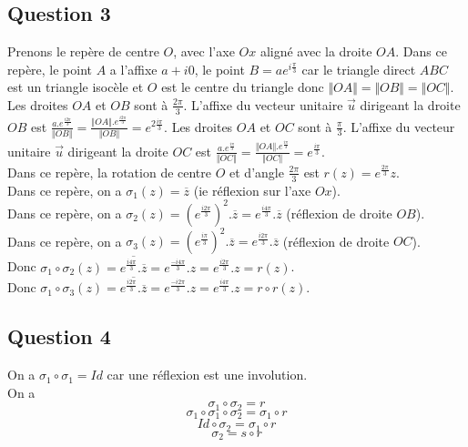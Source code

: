 \documentclass[]{book}
\theoremstyle{definition}
\begin{document}
\subsection*{Question 3}
Prenons le rep\`ere de centre $O$, avec l'axe $Ox$ align\'e avec la droite $OA$. Dans ce rep\`ere, le point $A$ a l'affixe $a+i0$, le point $B = ae^{i\frac{\pi}{3}}$ car le triangle direct $ABC$ est un triangle isoc\`ele et $O$ est le centre du triangle donc $\Vert OA \Vert = \Vert OB \Vert = \Vert OC \Vert$. Les droites $OA$ et $OB$ sont \`a $\frac{2\pi}{3}$. L'affixe du vecteur unitaire $\overrightarrow{u}$ dirigeant la droite $OB$ est $\frac{a.e^{\frac{i2\pi}{3}}}{\Vert OB \Vert} = \frac{\Vert OA \Vert.e^{\frac{i2\pi}{3}}}{\Vert OB \Vert} = e^{2\frac{i\pi}{3}}$. Les droites $OA$ et $OC$ sont \`a $\frac{\pi}{3}$. L'affixe du vecteur unitaire $\overrightarrow{u}$ dirigeant la droite $OC$ est $\frac{a.e^{\frac{i\pi}{3}}}{\Vert OC \Vert} = \frac{\Vert OA \Vert.e^{\frac{i\pi}{3}}}{\Vert OC \Vert} = e^{\frac{i\pi}{3}}$.\\

Dans ce rep\`ere, la rotation de centre $O$ et d'angle $\frac{2\pi}{3}$ est $r(z) = e^{\frac{2\pi}{3}}z$.\\

Dans ce rep\`ere, on a $\sigma_1(z) = \overline{z}$ (ie r\'eflexion sur l'axe $Ox$).\\

Dans ce rep\`ere, on a  $\sigma_2(z) = (e^{\frac{i2\pi}{3}})^2.\overline{z} = e^{\frac{i4\pi}{3}}.\overline{z}$ (r\'eflexion de droite $OB$). \\

Dans ce rep\`ere, on a  $\sigma_3(z) = (e^{\frac{i\pi}{3}})^2.\overline{z} = e^{\frac{i2\pi}{3}}.\overline{z} $ (r\'eflexion de droite $OC$). \\

Donc $\sigma_1 \circ \sigma_2(z) = \overline{e^{\frac{i4\pi}{3}}.\overline{z}} = e^{\frac{-i4\pi}{3}}.z = e^{\frac{i2\pi}{3}}.z =  r(z)$.\\

Donc $\sigma_1 \circ \sigma_3(z) = \overline{e^{\frac{i2\pi}{3}}.\overline{z}} = e^{\frac{-i2\pi}{3}}.z = e^{\frac{i4\pi}{3}}.z = r \circ r(z)$.\\


\subsection*{Question 4}
On a $\sigma_1 \circ \sigma_1 = Id$ car une r\'eflexion est une involution.\\
On a
$$\sigma_1 \circ \sigma_2 = r$$
$$\sigma_1 \circ \sigma_1 \circ \sigma_2 = \sigma_1 \circ r$$
$$Id \circ \sigma_2 = \sigma_1 \circ r$$
$$\sigma_2 = s \circ r $$
\end{document}
